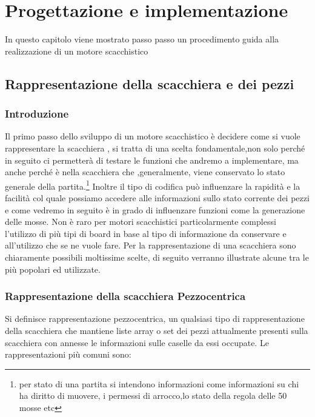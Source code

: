 \chapter{Progettazione e implementazione}
%

\begin{citazione}
    In questo capitolo viene mostrato passo passo un procedimento guida alla realizzazione di un motore scacchistico
\end{citazione}

\newpage
\section{Rappresentazione della scacchiera e dei pezzi}

\subsection{Introduzione} %
Il primo passo dello sviluppo di un motore scacchistico è decidere come si vuole rappresentare
la scacchiera , si tratta di una scelta fondamentale,non solo perché in seguito ci permetterà
di testare le funzioni che andremo a implementare, ma anche perché è nella scacchiera che ,generalmente,
viene conservato lo stato generale della partita.\footnote{per stato di una partita si intendono informazioni come
    informazioni su chi ha diritto di muovere, i permessi di arrocco,lo stato della regola delle 50 mosse etc}
Inoltre il tipo di codifica può influenzare la rapidità
e la facilità col quale possiamo accedere alle informazioni sullo stato corrente dei pezzi
e come vedremo in seguito è in grado di influenzare funzioni come la generazione delle mosse.
Non è raro per motori scacchistici particolarmente complessi l'utilizzo di più tipi di board in base
al tipo di informazione da conservare e all'utilizzo che se ne vuole fare.
Per la rappresentazione di una scacchiera sono chiaramente possibili moltissime scelte, di seguito
verranno illustrate alcune tra le più popolari ed utilizzate.

\subsection{Rappresentazione della scacchiera Pezzocentrica}
Si definisce rappresentazione pezzocentrica, un qualsiasi tipo di rappresentazione della scacchiera che mantiene liste
array o set dei pezzi attualmente presenti sulla scacchiera con annesse le informazioni sulle caselle da essi occupate.
Le rappresentazioni più comuni sono:
